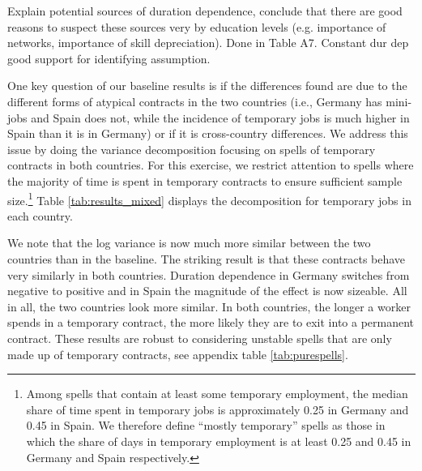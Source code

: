 \documentclass[12pt]{article}
\theoremstyle{definition}
\theoremstyle{remark}
\begin{document}
\textcolor{mygreen}{Explain potential sources of duration dependence, conclude that there are good reasons to suspect these sources very by education levels (e.g. importance of networks, importance of skill depreciation). Done in Table A7. Constant dur dep good support for identifying assumption.}


One key question of our baseline results is if the differences found are due to the different forms of atypical contracts in the two countries (i.e., Germany has mini-jobs and Spain does not, while the incidence of temporary jobs is much higher in Spain than it is in  Germany) or if it is cross-country differences. We address this issue by doing the variance decomposition focusing on spells of temporary contracts in both countries. 
For this exercise, we restrict attention to spells where the majority of time is spent in temporary contracts to ensure sufficient sample size.\footnote{Among spells that contain at least some temporary employment, the median share of time spent in temporary jobs is approximately 0.25 in Germany and 0.45 in Spain. We therefore define ``mostly temporary'' spells as those in which the share of days in temporary employment is at least 0.25 and 0.45 in Germany and Spain respectively.} Table \ref{tab:results_mixed} displays the decomposition for temporary jobs in each country.

We note that the log variance is now much more similar between the two countries than in the baseline. 
The striking result is that these contracts behave very similarly in both countries. Duration dependence in Germany switches from negative to positive and in Spain the magnitude of the effect is now sizeable. All in all, the two countries look more similar. 
In both countries, the longer a worker spends in a temporary contract, the more likely they are to exit into a permanent contract.
These results are robust to considering unstable spells that are only made up of temporary contracts, see appendix table \ref{tab:purespells}.
\end{document}
